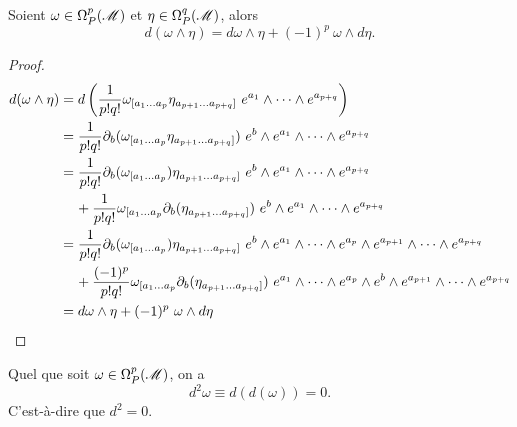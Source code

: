 \documentclass[a4paper,11pt]{report}
\begin{document}
            \begin{prop}\begin{leftbar}
                Soient $\omega\in\Omega_P^p(\mathscr{M})$ et $\eta\in\Omega_P^q(\mathscr{M})$, alors
                \begin{equation}
                    d(\omega\wedge\eta) = d\omega\wedge\eta+(-1)^{p}~\omega\wedge d\eta.
                \end{equation}
            \end{leftbar}\end{prop}
            
            \begin{proof}
                \begin{align}
                    d(\omega\wedge\eta) &= d\left( \frac{1}{p!q!} \omega_{[a_1\dots a_p}\eta_{a_{p+1}\dots a_{p+q}]}~e^{a_1}\wedge \dots\wedge e^{a_{p+q}} \right) \\
                    &= \frac{1}{p!q!} \partial_b (\omega_{[a_1\dots a_p}\eta_{a_{p+1}\dots a_{p+q}]})~e^b\wedge e^{a_1}\wedge \dots\wedge e^{a_{p+q}} \\
                    &=\frac{1}{p!q!} \partial_b (\omega_{[a_1\dots a_p})\eta_{a_{p+1}\dots a_{p+q}]}~e^b\wedge e^{a_1}\wedge \dots\wedge e^{a_{p+q}} \\
                    &\hspace{0.4cm} +\frac{1}{p!q!} \omega_{[a_1\dots a_p}\partial_b (\eta_{a_{p+1}\dots a_{p+q}]})~e^b\wedge e^{a_1}\wedge \dots\wedge e^{a_{p+q}} \\
                    &=\frac{1}{p!q!} \partial_b (\omega_{[a_1\dots a_p})\eta_{a_{p+1}\dots a_{p+q}]}~e^b\wedge e^{a_1}\wedge\dots\wedge e^{a_p}\wedge e^{a_{p+1}}\wedge \dots\wedge e^{a_{p+q}} \\
                    &\hspace{0.4cm} +\frac{(-1)^p}{p!q!} \omega_{[a_1\dots a_p}\partial_b (\eta_{a_{p+1}\dots a_{p+q}]})~ e^{a_1}\wedge\dots\wedge e^{a_p}\wedge e^b\wedge e^{a_{p+1}}\wedge \dots\wedge e^{a_{p+q}} \\
                    &= d\omega\wedge\eta+(-1)^{p}~\omega\wedge d\eta
                \end{align}
            \end{proof}
            
            \begin{prop}\begin{leftbar}
                Quel que soit $\omega\in\Omega_P^p(\mathscr{M})$, on a 
                \begin{equation}
                    d^2\omega \equiv d(d(\omega)) = 0.
                \end{equation}
                C'est-à-dire que $d^2 = 0$.
            \end{leftbar}\end{prop}
            
\end{document}
